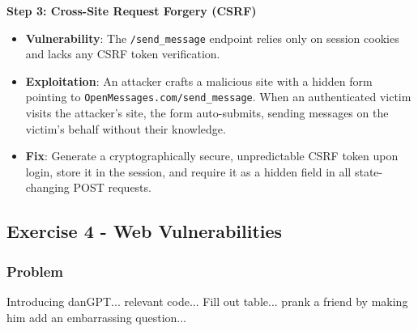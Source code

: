 \documentclass{article}
\begin{document}
\textbf{Step 3: Cross-Site Request Forgery (CSRF)}
\begin{itemize}
    \item \textbf{Vulnerability}: The \texttt{/send\_message} endpoint relies only on session cookies and lacks any CSRF token verification.
    \item \textbf{Exploitation}: An attacker crafts a malicious site with a hidden form pointing to \texttt{OpenMessages.com/send\_message}. When an authenticated victim visits the attacker's site, the form auto-submits, sending messages on the victim's behalf without their knowledge.
    \item \textbf{Fix}: Generate a cryptographically secure, unpredictable CSRF token upon login, store it in the session, and require it as a hidden field in all state-changing POST requests.
\end{itemize}

\subsection{Exercise 4 - Web Vulnerabilities}
\subsubsection*{Problem}
Introducing danGPT... relevant code... Fill out table... prank a friend by making him add an embarrassing question...
\end{document}

